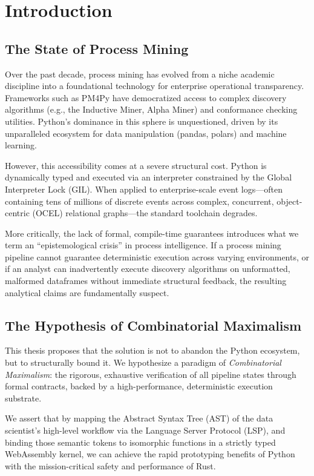 \documentclass[11pt,twoside,openright]{book}
\begin{document}
\tableofcontents
\listoffigures

\mainmatter

\chapter{Introduction}

\section{The State of Process Mining}
Over the past decade, process mining has evolved from a niche academic discipline into a foundational technology for enterprise operational transparency. Frameworks such as PM4Py have democratized access to complex discovery algorithms (e.g., the Inductive Miner, Alpha Miner) and conformance checking utilities. Python's dominance in this sphere is unquestioned, driven by its unparalleled ecosystem for data manipulation (pandas, polars) and machine learning.

However, this accessibility comes at a severe structural cost. Python is dynamically typed and executed via an interpreter constrained by the Global Interpreter Lock (GIL). When applied to enterprise-scale event logs---often containing tens of millions of discrete events across complex, concurrent, object-centric (OCEL) relational graphs---the standard toolchain degrades. 

More critically, the lack of formal, compile-time guarantees introduces what we term an ``epistemological crisis'' in process intelligence. If a process mining pipeline cannot guarantee deterministic execution across varying environments, or if an analyst can inadvertently execute discovery algorithms on unformatted, malformed dataframes without immediate structural feedback, the resulting analytical claims are fundamentally suspect.

\section{The Hypothesis of Combinatorial Maximalism}
This thesis proposes that the solution is not to abandon the Python ecosystem, but to structurally bound it. We hypothesize a paradigm of \textit{Combinatorial Maximalism}: the rigorous, exhaustive verification of all pipeline states through formal contracts, backed by a high-performance, deterministic execution substrate.

We assert that by mapping the Abstract Syntax Tree (AST) of the data scientist's high-level workflow via the Language Server Protocol (LSP), and binding those semantic tokens to isomorphic functions in a strictly typed WebAssembly kernel, we can achieve the rapid prototyping benefits of Python with the mission-critical safety and performance of Rust.
\end{document}
